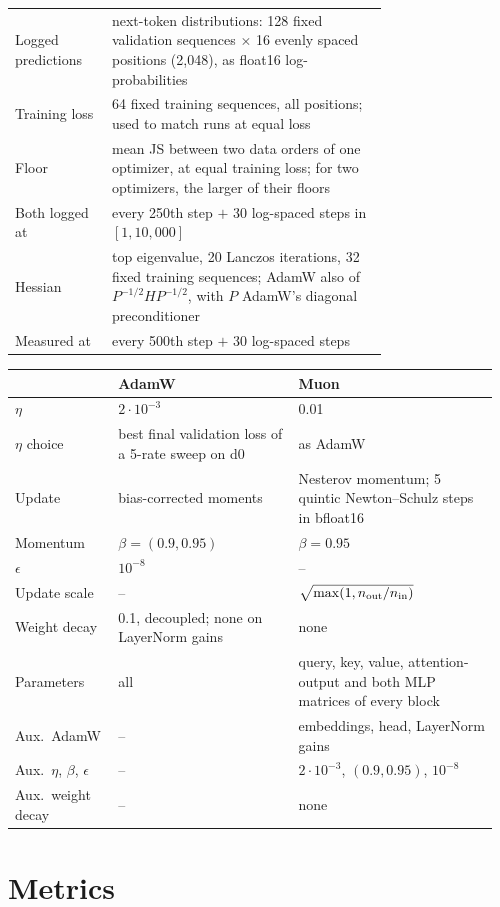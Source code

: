 \begin{center}
\begin{tabular}{@{}lp{0.74\linewidth}@{}}
\hline
Logged predictions & next-token distributions: 128 fixed validation sequences $\times$ 16 evenly spaced positions
  (2{,}048), as float16 log-probabilities \\
Training loss & 64 fixed training sequences, all positions; used to match runs at equal loss \\
Floor & mean JS between two data orders of one optimizer, at equal training loss; for two optimizers, the larger
  of their floors \\
Both logged at & every 250th step $+$ 30 log-spaced steps in $[1, 10{,}000]$ \\
\hline
Hessian & top eigenvalue, 20 Lanczos iterations, 32 fixed training sequences; AdamW also of
  $P^{-1/2}HP^{-1/2}$, with $P$ AdamW's diagonal preconditioner \\
Measured at & every 500th step $+$ 30 log-spaced steps \\
\hline
\end{tabular}
\end{center}

\begin{center}\small
\captionsetup{type=table}
\caption{Optimizer-specific hyperparameters. $n_{\rm out}$, $n_{\rm in}$: output and input size of the matrix.}
\label{tab:app-optim}
\setlength{\tabcolsep}{4pt}
\begin{tabular}{@{}p{0.2\linewidth}p{0.36\linewidth}p{0.4\linewidth}@{}}
\hline
 & AdamW & Muon \tabularnewline
\hline
$\eta$ & $2\cdot10^{-3}$ & 0.01 \tabularnewline
$\eta$ choice & \raggedright best final validation loss of a 5-rate sweep on d0 & as AdamW \tabularnewline
Update & bias-corrected moments & \raggedright Nesterov momentum; 5 quintic Newton--Schulz steps in bfloat16 \tabularnewline
Momentum & $\beta=(0.9,0.95)$ & $\beta=0.95$ \tabularnewline
$\epsilon$ & $10^{-8}$ & -- \tabularnewline
Update scale & -- & $\sqrt{\max(1,n_{\rm out}/n_{\rm in})}$ \tabularnewline
Weight decay & \raggedright 0.1, decoupled; none on LayerNorm gains & none \tabularnewline
Parameters & all & \raggedright query, key, value, attention-output and both MLP matrices of every block \tabularnewline
\hline
Aux.\ AdamW & -- & embeddings, head, LayerNorm gains \tabularnewline
Aux.\ $\eta$, $\beta$, $\epsilon$ & -- & $2\cdot10^{-3}$, $(0.9,0.95)$, $10^{-8}$ \tabularnewline
Aux.\ weight decay & -- & none \tabularnewline
\hline
\end{tabular}
\end{center}

\section{Metrics}
\label{app:metrics}

